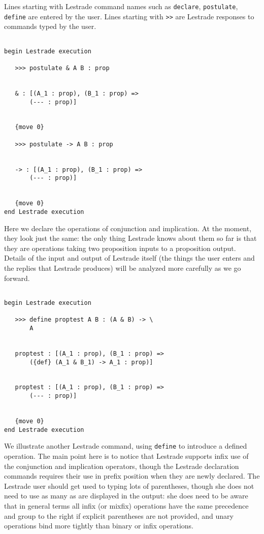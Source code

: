 \documentclass[12pt]{article}
\begin{document}
Lines starting with Lestrade command names such as {\tt declare}, {\tt postulate}, {\tt define} are entered by the user.  Lines starting with {\tt >>} are Lestrade responses to commands typed by the user.

\begin{verbatim}

begin Lestrade execution

   >>> postulate & A B : prop


   & : [(A_1 : prop), (B_1 : prop) => 
       (--- : prop)]


   {move 0}

   >>> postulate -> A B : prop


   -> : [(A_1 : prop), (B_1 : prop) => 
       (--- : prop)]


   {move 0}
end Lestrade execution
\end{verbatim}

Here we declare the operations of conjunction and implication.  At the moment, they look just the same:  the only thing Lestrade knows about them so far is that they are operations taking two proposition inputs to a proposition output.  Details of the input and output of Lestrade itself (the things the user enters and the replies that Lestrade produces) will be analyzed more carefully as we go forward.

\begin{verbatim}

begin Lestrade execution

   >>> define proptest A B : (A & B) -> \
       A


   proptest : [(A_1 : prop), (B_1 : prop) => 
       ({def} (A_1 & B_1) -> A_1 : prop)]


   proptest : [(A_1 : prop), (B_1 : prop) => 
       (--- : prop)]


   {move 0}
end Lestrade execution
\end{verbatim}

We illustrate another Lestrade command, using {\tt define} to introduce a defined operation.  The main point here is to notice that Lestrade supports
infix use of the conjunction and implication operators, though the Lestrade declaration commands requires their use in prefix position when they are newly declared.  The Lestrade user should get used to typing lots of parentheses, though she does not need to use as many as are displayed in the output:  she does need to be aware that in general terms all infix (or mixfix) operations have the same precedence and group to the right if explicit parentheses are not provided, and unary operations bind more tightly than binary or infix operations.
\end{document}
